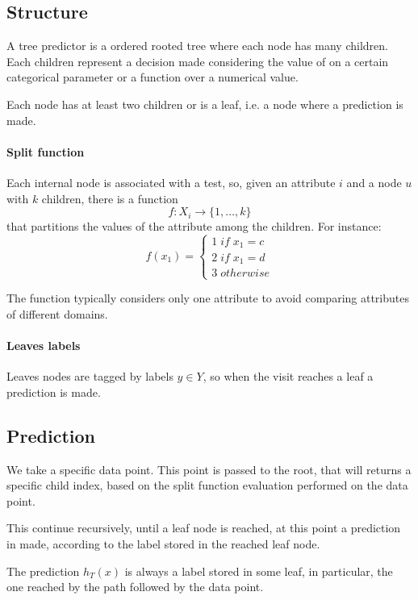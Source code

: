 \subsection{Structure}
A tree predictor is a ordered rooted tree where each node has many children.
Each children represent a decision made considering the value
of on a certain categorical parameter or a function over a numerical value.

Each node has at least two children or is a leaf, i.e. a node where a prediction is 
made.

\paragraph{Split function}
Each internal node is associated with a test, so, given an attribute 
$i$ and a node $u$ with $k$ children, there is a function
$$f : X_i \rightarrow \{1, \dots, k\}$$
that partitions the values of the attribute among the children.
For instance:
\[ 
    f(x_1) = \begin{cases}
        1 \mathit{\;if\;} x_1 = c\\
        2 \mathit{\;if\;} x_1 = d\\
        3 \mathit{\;otherwise}
    \end{cases}\]

\begin{remark}
    The function typically considers only one attribute to avoid 
    comparing attributes of different domains.
\end{remark}

\paragraph{Leaves labels}
Leaves nodes are tagged by labels $y \in Y$, so when the visit reaches a leaf 
a prediction is made.

\subsection{Prediction}
We take a specific data point. This point is passed to the root, that will 
returns a specific child index, based on the split function evaluation 
performed on the data point.

This continue recursively, until a leaf node is reached, at this point 
a prediction in made, according to the label stored in the reached leaf 
node.

The prediction $h_T(x)$ is always a label stored in some leaf, in particular, the one 
reached by the path followed by the data point.

